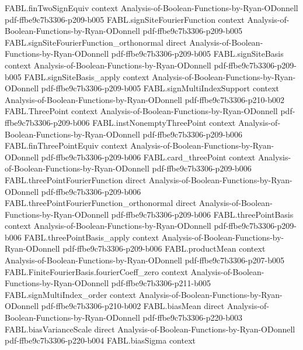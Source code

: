 \begin{theorem}
\proofstep
  {FABL.finTwoSignEquiv}
  {context}
  {Analysis-of-Boolean-Functions-by-Ryan-ODonnell}
  {pdf-ffbe9c7b3306-p209-b005}
\proofstep
  {FABL.signSiteFourierFunction}
  {context}
  {Analysis-of-Boolean-Functions-by-Ryan-ODonnell}
  {pdf-ffbe9c7b3306-p209-b005}
\proofstep
  {FABL.signSiteFourierFunction_orthonormal}
  {direct}
  {Analysis-of-Boolean-Functions-by-Ryan-ODonnell}
  {pdf-ffbe9c7b3306-p209-b005}
\proofstep
  {FABL.signSiteBasis}
  {context}
  {Analysis-of-Boolean-Functions-by-Ryan-ODonnell}
  {pdf-ffbe9c7b3306-p209-b005}
\proofstep
  {FABL.signSiteBasis_apply}
  {context}
  {Analysis-of-Boolean-Functions-by-Ryan-ODonnell}
  {pdf-ffbe9c7b3306-p209-b005}
\proofstep
  {FABL.signMultiIndexSupport}
  {context}
  {Analysis-of-Boolean-Functions-by-Ryan-ODonnell}
  {pdf-ffbe9c7b3306-p210-b002}
\proofstep
  {FABL.ThreePoint}
  {context}
  {Analysis-of-Boolean-Functions-by-Ryan-ODonnell}
  {pdf-ffbe9c7b3306-p209-b006}
\proofstep
  {FABL.instNonemptyThreePoint}
  {context}
  {Analysis-of-Boolean-Functions-by-Ryan-ODonnell}
  {pdf-ffbe9c7b3306-p209-b006}
\proofstep
  {FABL.finThreePointEquiv}
  {context}
  {Analysis-of-Boolean-Functions-by-Ryan-ODonnell}
  {pdf-ffbe9c7b3306-p209-b006}
\proofstep
  {FABL.card_threePoint}
  {context}
  {Analysis-of-Boolean-Functions-by-Ryan-ODonnell}
  {pdf-ffbe9c7b3306-p209-b006}
\proofstep
  {FABL.threePointFourierFunction}
  {direct}
  {Analysis-of-Boolean-Functions-by-Ryan-ODonnell}
  {pdf-ffbe9c7b3306-p209-b006}
\proofstep
  {FABL.threePointFourierFunction_orthonormal}
  {direct}
  {Analysis-of-Boolean-Functions-by-Ryan-ODonnell}
  {pdf-ffbe9c7b3306-p209-b006}
\proofstep
  {FABL.threePointBasis}
  {context}
  {Analysis-of-Boolean-Functions-by-Ryan-ODonnell}
  {pdf-ffbe9c7b3306-p209-b006}
\proofstep
  {FABL.threePointBasis_apply}
  {context}
  {Analysis-of-Boolean-Functions-by-Ryan-ODonnell}
  {pdf-ffbe9c7b3306-p209-b006}
\proofstep
  {FABL.productMean}
  {context}
  {Analysis-of-Boolean-Functions-by-Ryan-ODonnell}
  {pdf-ffbe9c7b3306-p207-b005}
\proofstep
  {FABL.FiniteFourierBasis.fourierCoeff_zero}
  {context}
  {Analysis-of-Boolean-Functions-by-Ryan-ODonnell}
  {pdf-ffbe9c7b3306-p211-b005}
\proofstep
  {FABL.signMultiIndex_order}
  {context}
  {Analysis-of-Boolean-Functions-by-Ryan-ODonnell}
  {pdf-ffbe9c7b3306-p210-b002}
\proofstep
  {FABL.biasMean}
  {direct}
  {Analysis-of-Boolean-Functions-by-Ryan-ODonnell}
  {pdf-ffbe9c7b3306-p220-b003}
\proofstep
  {FABL.biasVarianceScale}
  {direct}
  {Analysis-of-Boolean-Functions-by-Ryan-ODonnell}
  {pdf-ffbe9c7b3306-p220-b004}
\proofstep
  {FABL.biasSigma}
  {context}

\end{theorem}
